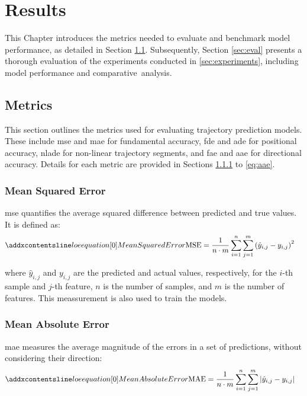 \chapter{Results}
\label{chapt:results}
This Chapter introduces the metrics needed to evaluate and benchmark model performance, as detailed in Section \ref{sec:metrics}. Subsequently, Section \ref{sec:eval} presents a thorough evaluation of the experiments conducted in \ref{sec:experiments}, including model performance and comparative~analysis.


\section{Metrics}
\label{sec:metrics}
This section outlines the metrics used for evaluating trajectory prediction models. These include \gls{mse} and \gls{mae} for fundamental accuracy, \gls{fde} and \gls{ade} for positional accuracy, \gls{nlade} for non-linear trajectory segments, and \gls{fae} and \gls{aae} for directional accuracy. Details for each metric are provided in Sections \ref{eq:mse} to \ref{eq:aae}.

\subsection{Mean Squared Error}
\label{eq:mse}
\gls{mse} quantifies the average squared difference between predicted and true values. It is defined as:
\begin{align}
\setequationentry{Mean Squared Error}
    \text{MSE} &= \frac{1}{n \cdot m} \sum_{i=1}^n \sum_{j=1}^m \left( \hat{y}_{i,j} - y_{i,j} \right)^2
\end{align}

where \(\hat{y}_{i,j}\) and \(y_{i,j}\) are the predicted and actual values, respectively, for the \(i\)-th sample and \(j\)-th feature, \(n\) is the number of samples, and \(m\) is the number of features. This meassurement is also used to train the models.

\subsection{Mean Absolute Error}
\label{eq:mae}
\gls{mae} measures the average magnitude of the errors in a set of predictions, without considering their direction:
\begin{align}
\setequationentry{Mean Absolute Error}
    \text{MAE} &= \frac{1}{n \cdot m} \sum_{i=1}^n \sum_{j=1}^m \left| \hat{y}_{i,j} - y_{i,j} \right|
\end{align}

